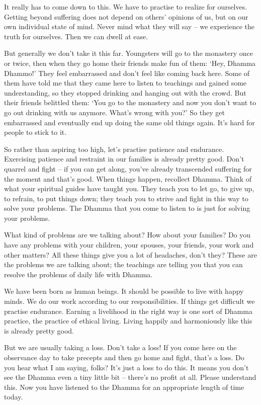 It really has to come down to this. We have to practise to realize for ourselves. Getting beyond suffering does not depend on others' opinions of us, but on our own individual state of mind. Never mind what they will say -- we experience the truth for ourselves. Then we can dwell at ease.

But generally we don't take it this far. Youngsters will go to the monastery once or twice, then when they go home their friends make fun of them: `Hey, Dhamma Dhammo!' They feel embarrassed and don't feel like coming back here. Some of them have told me that they came here to listen to teachings and gained some understanding, so they stopped drinking and hanging out with the crowd. But their friends belittled them: `You go to the monastery and now you don't want to go out drinking with us anymore. What's wrong with you?' So they get embarrassed and eventually end up doing the same old things again. It's hard for people to stick to it.

So rather than aspiring too high, let's practise patience and endurance. Exercising patience and restraint in our families is already pretty good. Don't quarrel and fight -- if you can get along, you've already transcended suffering for the moment and that's good. When things happen, recollect Dhamma. Think of what your spiritual guides have taught you. They teach you to let go, to give up, to refrain, to put things down; they teach you to strive and fight in this way to solve your problems. The Dhamma that you come to listen to is just for solving your problems.

What kind of problems are we talking about? How about your families? Do you have any problems with your children, your spouses, your friends, your work and other matters? All these things give you a lot of headaches, don't they? These are the problems we are talking about; the teachings are telling you that you can resolve the problems of daily life with Dhamma.

We have been born as human beings. It should be possible to live with happy minds. We do our work according to our responsibilities. If things get difficult we practise endurance. Earning a livelihood in the right way is one sort of Dhamma practice, the practice of ethical living. Living happily and harmoniously like this is already pretty good.

But we are usually taking a loss. Don't take a loss! If you come here on the observance day to take precepts and then go home and fight, that's a loss. Do you hear what I am saying, folks? It's just a loss to do this. It means you don't see the Dhamma even a tiny little bit -- there's no profit at all. Please understand this. Now you have listened to the Dhamma for an appropriate length of time today.

